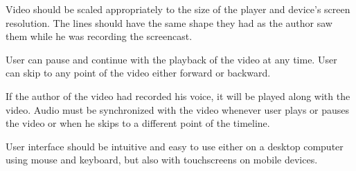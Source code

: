 Video should be scaled appropriately to the size of the player and device's screen resolution. The lines should have the same shape they had as the author saw them while he was recording the screencast.

User can pause and continue with the playback of the video at any time. User can skip to any point of the video either forward or backward.

If the author of the video had recorded his voice, it will be played along with the video. Audio must be synchronized with the video whenever user plays or pauses the video or when he skips to a different point of the timeline.

User interface should be intuitive and easy to use either on a desktop computer using mouse and keyboard, but also with touchscreens on mobile devices.